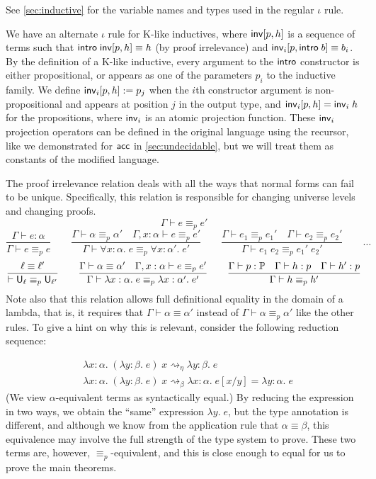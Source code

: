 See \autoref{sec:inductive} for the variable names and types used in the regular $\iota$ rule.

We have an alternate $\iota$ rule for K-like inductives, where $\mathsf{inv}[p,h]$ is a sequence of terms such that $\mathsf{intro}\;\mathsf{inv}[p,h]\equiv h$ (by proof irrelevance) and $\mathsf{inv}_i[p,\mathsf{intro}\;b]\equiv b_i$. By the definition of a K-like inductive, every argument to the $\mathsf{intro}$ constructor is either propositional, or appears as one of the parameters $p_i$ to the inductive family. We define $\mathsf{inv}_i[p,h]:=p_j$ when the $i$th constructor argument is non-propositional and appears at position $j$ in the output type, and $\mathsf{inv}_i[p,h]=\mathsf{inv}_i\;h$ for the propositions, where $\mathsf{inv}_i$ is an atomic projection function. These $\mathsf{inv}_i$ projection operators can be defined in the original language using the recursor, like we demonstrated for $\mathsf{acc}$ in \autoref{sec:undecidable}, but we will treat them as constants of the modified language.

The proof irrelevance relation deals with all the ways that normal forms can fail to be unique. Specifically, this relation is responsible for changing universe levels and changing proofs.
$$\boxed{\Gamma\vdash e\equiv_p e'}$$
$$\frac{\Gamma\vdash e:\alpha}{\Gamma\vdash e\equiv_p e}\qquad
\frac{\Gamma\vdash\alpha\equiv_p\alpha'\quad \Gamma,x:\alpha\vdash e\equiv_p e'}{\Gamma\vdash \forall x:\alpha.\;e\equiv_p \forall x:\alpha'.\;e'}\qquad
\frac{\Gamma\vdash e_1\equiv_p e_1'\quad \Gamma\vdash e_2\equiv_p e_2'}{\Gamma\vdash e_1\;e_2\equiv_p e_1'\;e_2'}\qquad\dots$$
$$\frac{\ell\equiv\ell'}{\vdash \U_\ell\equiv_p\U_{\ell'}}\qquad
\frac{\Gamma\vdash\alpha\equiv\alpha'\quad \Gamma,x:\alpha\vdash e\equiv_p e'}{\Gamma\vdash \lambda x:\alpha.\;e\equiv_p \lambda x:\alpha'.\;e'}\qquad
\frac{\Gamma\vdash p:\P\quad \Gamma\vdash h:p\quad \Gamma\vdash h':p}{\Gamma \vdash h\equiv_p h'}$$
Note also that this relation allows full definitional equality in the domain of a lambda, that is, it requires that $\Gamma\vdash \alpha\equiv\alpha'$ instead of $\Gamma\vdash \alpha\equiv_p\alpha'$ like the other rules. To give a hint on why this is relevant, consider the following reduction sequence:

\begin{align*}
&\lambda x:\alpha.\;(\lambda y:\beta.\;e)\;x\rightsquigarrow_\eta\lambda y:\beta.\;e\\
&\lambda x:\alpha.\;(\lambda y:\beta.\;e)\;x\rightsquigarrow_\beta\lambda x:\alpha.\;e[x/y]=\lambda y:\alpha.\;e
\end{align*}
(We view $\alpha$-equivalent terms as syntactically equal.) By reducing the expression in two ways, we obtain the ``same'' expression $\lambda y.\;e$, but the type annotation is different, and although we know from the application rule that $\alpha\equiv\beta$, this equivalence may involve the full strength of the type system to prove. These two terms are, however, $\equiv_p$-equivalent, and this is close enough to equal for us to prove the main theorems.

